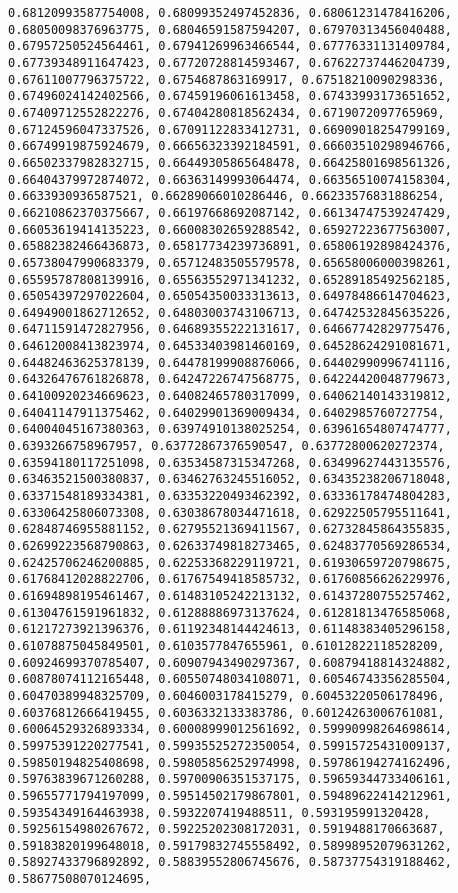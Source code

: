 \documentclass[11pt]{article}
\begin{document}
\begin{Verbatim}[commandchars=\\\{\}]
0.68120993587754008, 0.68099352497452836, 0.68061231478416206, 0.68050098376963775, 0.68046591587594207, 0.67970313456040488, 0.67957250524564461, 0.67941269963466544, 0.67776331131409784, 0.67739348911647423, 0.67720728814593467, 0.67622737446204739, 0.67611007796375722, 0.6754687863169917, 0.67518210090298336, 0.67496024142402566, 0.67459196061613458, 0.67433993173651652, 0.67409712552822276, 0.67404280818562434, 0.6719072097765969, 0.67124596047337526, 0.67091122833412731, 0.66909018254799169, 0.66749919875924679, 0.66656323392184591, 0.66603510298946766, 0.66502337982832715, 0.66449305865648478, 0.66425801698561326, 0.66404379972874072, 0.66363149993064474, 0.66356510074158304, 0.6633930936587521, 0.66289066010286446, 0.66233576831886254, 0.66210862370375667, 0.66197668692087142, 0.66134747539247429, 0.66053619414135223, 0.66008302659288542, 0.65927223677563007, 0.65882382466436873, 0.65817734239736891, 0.65806192898424376, 0.65738047990683379, 0.65712483505579578, 0.65658006000398261, 0.65595787808139916, 0.65563552971341232, 0.65289185492562185, 0.65054397297022604, 0.65054350033313613, 0.64978486614704623, 0.64949001862712652, 0.64803003743106713, 0.64742532845635226, 0.64711591472827956, 0.64689355222131617, 0.64667742829775476, 0.64612008413823974, 0.64533403981460169, 0.64528624291081671, 0.64482463625378139, 0.64478199908876066, 0.64402990996741116, 0.64326476761826878, 0.64247226747568775, 0.64224420048779673, 0.64100920234669623, 0.64082465780317099, 0.64062140143319812, 0.64041147911375462, 0.64029901369009434, 0.6402985760727754, 0.64004045167380363, 0.63974910138025254, 0.63961654807474777, 0.6393266758967957, 0.63772867376590547, 0.63772800620272374, 0.63594180117251098, 0.63534587315347268, 0.63499627443135576, 0.63463521500380837, 0.63462763245516052, 0.63435238206718048, 0.63371548189334381, 0.63353220493462392, 0.63336178474804283, 0.63306425806073308, 0.63038678034471618, 0.62922505795511641, 0.62848746955881152, 0.62795521369411567, 0.62732845864355835, 0.62699223568790863, 0.62633749818273465, 0.62483770569286534, 0.62425706246200885, 0.62253368229119721, 0.61930659720798675, 0.61768412028822706, 0.61767549418585732, 0.61760856626229976, 0.61694898195461467, 0.61483105242213132, 0.61437280755257462, 0.61304761591961832, 0.61288886973137624, 0.61281813476585068, 0.61217273921396376, 0.61192348144424613, 0.61148383405296158, 0.61078875045849501, 0.6103577847655961, 0.61012822118528209, 0.60924699370785407, 0.60907943490297367, 0.60879418814324882, 0.60878074112165448, 0.60550748034108071, 0.60546743356285504, 0.60470389948325709, 0.6046003178415279, 0.60453220506178496, 0.60376812666419455, 0.6036332133383786, 0.60124263006761081, 0.60064529326893334, 0.60008999012561692, 0.59990998264698614, 0.59975391220277541, 0.59935525272350054, 0.59915725431009137, 0.59850194825408698, 0.59805856252974998, 0.59786194274162496, 0.59763839671260288, 0.59700906351537175, 0.59659344733406161, 0.59655771794197099, 0.59514502179867801, 0.59489622414212961, 0.59354349164463938, 0.5932207419488511, 0.593195991320428, 0.59256154980267672, 0.59225202308172031, 0.5919488170663687, 0.59183820199648018, 0.59179832745558492, 0.58998952079631262, 0.58927433796892892, 0.58839552806745676, 0.58737754319188462, 0.58677508070124695, 
\end{Verbatim}
\end{document}
